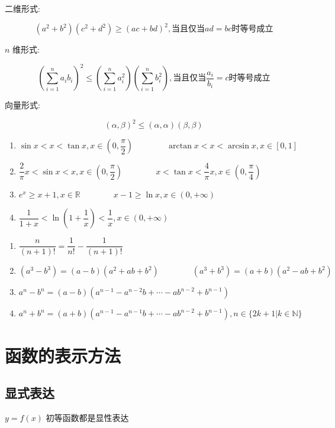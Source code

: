 \begin{theorem}[柯西不等式]
	二维形式:
	
	$$(a^{2}+b^{2})(c^{2}+d^{2})\geq (ac+bd)^{2}, \text{当且仅当} ad =bc \text{时等号成立}$$
	
	$n$ 维形式:
	
	$$\left(\sum_{i=1}^{n}a_{i}b_{i}\right)^{2}\leq \left(\sum_{i=1}^{n}a_{i}^{2}\right)\left(\sum_{i=1}^{n}b_{i}^{2}\right),\text{当且仅当} \dfrac{a_{i}}{b_{i}}=c\text{时等号成立}$$
	
	向量形式:

	$$(\alpha,\beta)^{2}\leq (\alpha,\alpha)(\beta,\beta)$$
\end{theorem}
\begin{theorem}[重要不等式]
	\begin{enumerate}
		\item $\sin x < x < \tan x, x\in (0,\dfrac{\pi}{2})\qquad \qquad \arctan x < x < \arcsin x, x\in[0,1]$
		\item $\dfrac{2}{\pi}x < \sin x < x, x\in(0,\dfrac{\pi}{2})\qquad \qquad x < \tan x < \dfrac{4}{\pi}x , x\in(0,\dfrac{\pi}{4})$
		\item $e^{x} \geq x + 1,x\in\mathbb{R}\qquad \qquad x-1 \geq \ln x, x\in(0,+\infty)$
		\item $\dfrac{1}{1+x} < \ln (1+\dfrac{1}{x}) < \dfrac{1}{x}, x\in(0,+\infty)$
	\end{enumerate}
\end{theorem}

\begin{theorem}[重要公式]
	\begin{enumerate}
		\item $\dfrac{n}{(n+1)!} = \dfrac{1}{n!} - \dfrac{1}{(n+1)!}$
		\item $(a^{3}-b^{3}) = (a-b)(a^{2}+ab+b^{2})\qquad\qquad (a^{3}+b^{3}) = (a+b)(a^{2}-ab+b^{2})$
		\item $a^{n} - b^{n} = (a-b)(a^{n-1}-a^{n-2}b+\cdots -ab^{n-2}+b^{n-1})$
		\item $a^{n} + b^{n} = (a+b)(a^{n-1}-a^{n-1}b+\cdots -ab^{n-2} +b^{n-1}), n\in \{2k+1 | k\in \mathbb{N}\}$
	\end{enumerate}
\end{theorem}

\section{函数的表示方法}
\subsection{显式表达}
\begin{definition}[显示表达]
	$y = f(x)$ 初等函数都是显性表达
\end{definition}
